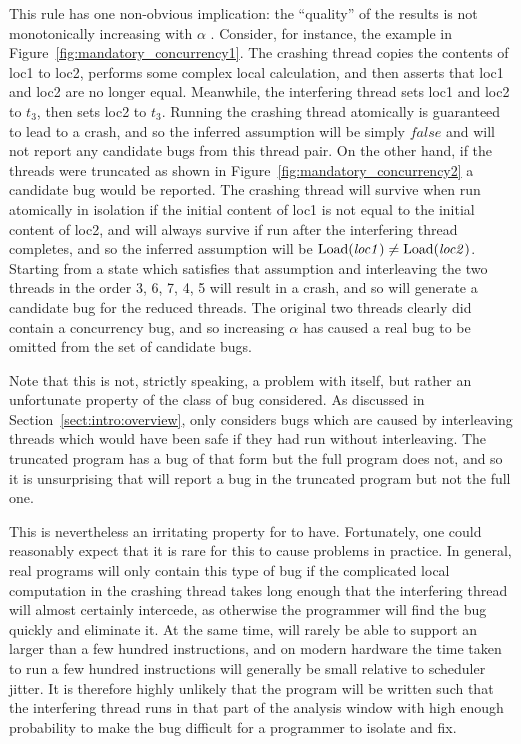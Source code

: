 This rule has one non-obvious implication: the ``quality'' of the
results is not monotonically increasing with $\alpha$
.  Consider, for instance, the example in
Figure~\ref{fig:mandatory_concurrency1}.  The crashing thread copies the contents of loc1 to loc2,
performs some complex local calculation, and then asserts that loc1
and loc2 are no longer equal.  Meanwhile, the interfering thread sets
loc1 and loc2 to $t_3$, then sets loc2 to $t_3$.  Running the crashing
thread atomically is guaranteed to lead to a crash, and so the
inferred assumption will be simply $\mathit{false}$ and {\technique}
will not report any candidate bugs from this thread pair.  On the
other hand, if the threads were truncated as shown in
Figure~\ref{fig:mandatory_concurrency2} a candidate bug would be
reported.  The crashing thread will survive when run atomically in
isolation if the initial content of loc1 is not equal to the initial
content of loc2, and will always survive if run after the interfering
thread completes, and so the inferred assumption will be
$\mathrm{Load}(\mathit{loc1}) \not= \mathrm{Load}(\mathit{loc2})$.  Starting from
a state which satisfies that assumption and interleaving the two
threads in the order 3, 6, 7, 4, 5 will result in a crash, and so
{\technique} will generate a candidate bug for the reduced threads.
The original two threads clearly did contain a concurrency bug, and so
increasing $\alpha$ has caused a real bug to be omitted from the set
of candidate bugs.

Note that this is not, strictly speaking, a problem with {\technique}
itself, but rather an unfortunate property of the class of bug
considered.  As discussed in Section~\ref{sect:intro:overview},
{\technique} only considers bugs which are caused by interleaving
threads which would have been safe if they had run without
interleaving.  The truncated program has a bug of that form but the
full program does not, and so it is unsurprising that {\technique}
will report a bug in the truncated program but not the full one.

This is nevertheless an irritating property for {\technique} to have.
Fortunately, one could reasonably expect that it is rare for this to
cause problems in practice.  In general, real programs will only
contain this type of bug if the complicated local computation in the
crashing thread takes long enough that the interfering thread will
almost certainly intercede, as otherwise the programmer will find the
bug quickly and eliminate it.  At the same time, {\technique} will
rarely be able to support an  larger than a
few hundred instructions, and on modern hardware the time taken to run
a few hundred instructions will generally be small relative to
scheduler jitter.  It is therefore highly unlikely that the program
will be written such that the interfering thread runs in that part of
the analysis window with high enough probability to make the bug
difficult for a programmer to isolate and fix.  


